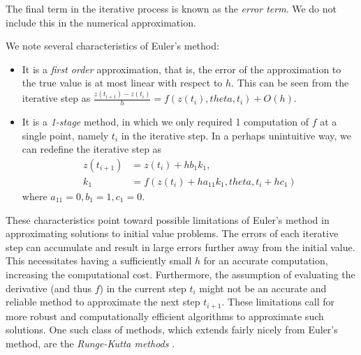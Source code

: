 \documentclass[a4paper,11pt,titlepage]{article}
\def\theta{theta}%
\theoremstyle{definition}
\theoremstyle{plain}
\theoremstyle{remark}
\begin{document}
The final term in the iterative process is known as the \textit{error term}. We do not include this in the numerical approximation.

We note several characteristics of Euler's method:
\begin{itemize}
    \item It is a \textit{first order} approximation, that is, the error of the approximation to the true value is at most linear with respect to $h$. This can be seen from the iterative step as $\frac{z(t_{i+1}) - z(t_i)}{h} = f(z(t_i),\theta,t_i) + O(h)$.
    \item It is a \textit{1-stage} method, in which we only required 1 computation of $f$ at a single point, namely $t_i$ in the iterative step. In a perhaps unintuitive way, we can redefine the iterative step as 
    \begin{align*}
        z(t_{i+1}) &= z(t_i) + h b_1 k_1, \\
        k_1 &= f\left(z(t_i) + h a_{11}k_1, \theta, t_i + hc_1\right)
    \end{align*}
    where $a_{11} = 0, b_1 = 1, c_1 = 0$.
\end{itemize}

These characteristics point toward possible limitations of Euler's method in approximating solutions to initial value problems. The errors of each iterative step can accumulate and result in large errors further away from the initial value. This necessitates having a sufficiently small $h$ for an accurate computation, increasing the computational cost. Furthermore, the assumption of evaluating the derivative (and thus $f$) in the current step $t_i$ might not be an accurate and reliable method to approximate the next step $t_{i+1}$. These limitations call for more robust and computationally efficient algorithms to approximate such solutions. One such class of methods, which extends fairly nicely from Euler's method, are the \textit{Runge-Kutta methods} \cite{sulimayers2003}.
\end{document}

